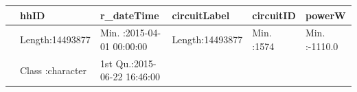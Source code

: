 \documentclass[]{article}
\begin{document}
\begin{longtable}[]{@{}llllll@{}}
\toprule
\begin{minipage}[b]{0.03\columnwidth}\raggedright\strut
\strut
\end{minipage} & \begin{minipage}[b]{0.15\columnwidth}\raggedright\strut
hhID\strut
\end{minipage} & \begin{minipage}[b]{0.24\columnwidth}\raggedright\strut
r\_dateTime\strut
\end{minipage} & \begin{minipage}[b]{0.15\columnwidth}\raggedright\strut
circuitLabel\strut
\end{minipage} & \begin{minipage}[b]{0.12\columnwidth}\raggedright\strut
circuitID\strut
\end{minipage} & \begin{minipage}[b]{0.14\columnwidth}\raggedright\strut
powerW\strut
\end{minipage}\tabularnewline
\midrule
\endhead
\begin{minipage}[t]{0.03\columnwidth}\raggedright\strut
\strut
\end{minipage} & \begin{minipage}[t]{0.15\columnwidth}\raggedright\strut
Length:14493877\strut
\end{minipage} & \begin{minipage}[t]{0.24\columnwidth}\raggedright\strut
Min. :2015-04-01 00:00:00\strut
\end{minipage} & \begin{minipage}[t]{0.15\columnwidth}\raggedright\strut
Length:14493877\strut
\end{minipage} & \begin{minipage}[t]{0.12\columnwidth}\raggedright\strut
Min. :1574\strut
\end{minipage} & \begin{minipage}[t]{0.14\columnwidth}\raggedright\strut
Min. :-1110.0\strut
\end{minipage}\tabularnewline
\begin{minipage}[t]{0.03\columnwidth}\raggedright\strut
\strut
\end{minipage} & \begin{minipage}[t]{0.15\columnwidth}\raggedright\strut
Class :character\strut
\end{minipage} & \begin{minipage}[t]{0.24\columnwidth}\raggedright\strut
1st Qu.:2015-06-22 16:46:00\strut

\end{minipage}
\end{longtable}
\end{document}
